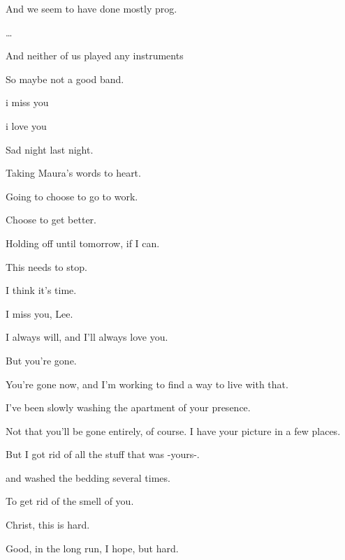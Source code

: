 { And we seem to have done mostly prog.

\ldots{}

 And neither of us played any instruments

 So maybe not a good band.

\nopagebreak

 i miss you

 i love you

 Sad night last night.

 Taking Maura's words to heart.

 Going to choose to go to work.

 Choose to get better.

 Holding off until tomorrow, if I can.

 This needs to stop.

 I think it's time.

\nopagebreak

 I miss you, Lee.

 I always will, and I'll always love you.

 But you're gone.

 You're gone now, and I'm working to find a way to live with that.

 I've been slowly washing the apartment of your presence.

 Not that you'll be gone entirely, of course. I have your picture in a few places.

 But I got rid of all the stuff that was
-yours-.

 and washed the bedding several times.

 To get rid of the smell of you.

 Christ, this is hard.

 Good, in the long run, I hope, but hard.

}
